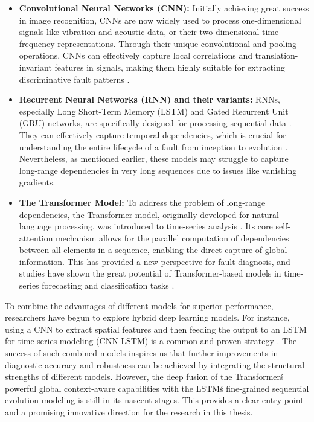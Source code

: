\begin{itemize}
    \item \textbf{Convolutional Neural Networks (CNN):} Initially achieving great success in image recognition, CNNs are now widely used to process one-dimensional signals like vibration and acoustic data, or their two-dimensional time-frequency representations. Through their unique convolutional and pooling operations, CNNs can effectively capture local correlations and translation-invariant features in signals, making them highly suitable for extracting discriminative fault patterns \cite{liu2018artificial}.
    \item \textbf{Recurrent Neural Networks (RNN) and their variants:} RNNs, especially Long Short-Term Memory (LSTM) and Gated Recurrent Unit (GRU) networks, are specifically designed for processing sequential data \cite{hochreiter1997long}. They can effectively capture temporal dependencies, which is crucial for understanding the entire lifecycle of a fault from inception to evolution \cite{filonov2016multivariateindustrialtimeseries}. Nevertheless, as mentioned earlier, these models may struggle to capture long-range dependencies in very long sequences due to issues like vanishing gradients.
    \item \textbf{The Transformer Model:} To address the problem of long-range dependencies, the Transformer model, originally developed for natural language processing, was introduced to time-series analysis \cite{vaswani2017attention}. Its core self-attention mechanism allows for the parallel computation of dependencies between all elements in a sequence, enabling the direct capture of global information. This has provided a new perspective for fault diagnosis, and studies have shown the great potential of Transformer-based models in time-series forecasting and classification tasks \cite{zhou2021informer}.
\end{itemize}

To combine the advantages of different models for superior performance, researchers have begun to explore hybrid deep learning models. For instance, using a CNN to extract spatial features and then feeding the output to an LSTM for time-series modeling (CNN-LSTM) is a common and proven strategy \cite{khan2018review}. The success of such combined models inspires us that further improvements in diagnostic accuracy and robustness can be achieved by integrating the structural strengths of different models. However, the deep fusion of the Transformer\'s powerful global context-aware capabilities with the LSTM\'s fine-grained sequential evolution modeling is still in its nascent stages. This provides a clear entry point and a promising innovative direction for the research in this thesis.



